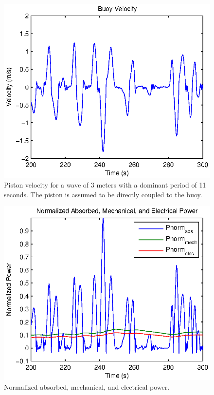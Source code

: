 \documentclass[twocolumn,10pt]{asme2e}
\begin{document}
\begin{figure}[t]
    \centering
    \includegraphics[width=1\columnwidth]{Images/DDzDot}
    \caption{Piston velocity for a wave of 3 meters with a dominant period of 11 seconds. The piston is assumed to be directly coupled to the buoy.}
    \label{HydZdot}
    \end{figure}

\begin{figure}[t]
    \centering
    \includegraphics[width=1\columnwidth]{Images/Power}
    \caption{Normalized absorbed, mechanical, and electrical power. }
    \label{HydP}
    \end{figure}
\end{document}
